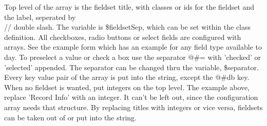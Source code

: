 \documentclass{article}
\begin{document}
Top level of the array is the fieldset title, with classes or ids for the fieldset and the label, 
seperated by \\// double slash. 
The variable is \$fieldsetSep, which can be set within the class definition. All checkboxes, radio buttons or 
select fields are configured with arrays. See the example form which has an example for any field type available
to day. To preselect a value or check a box use the separator @\#= with 'checked' or 'selected' appended. 
The separator can be changed thru the variable, \$separator. Every key value pair of the array is put into the 
string, except the @\#db key. When no fieldset is wanted, put integers on the top level. The example above, 
replace 'Record Info' with an integer. It can't be left out, since the configuration array needs that structure. 
By replacing titles with integers or vice versa, fieldsets can be taken out of or put into the string.
\end{document}
